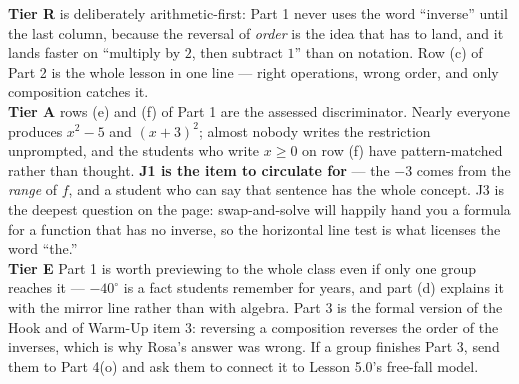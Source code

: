 \documentclass[10pt]{article}
\begin{document}
\begin{teachernote}
\small \textbf{Tier R} is deliberately arithmetic-first: Part 1 never uses the word ``inverse'' until
the last column, because the reversal of \emph{order} is the idea that has to land, and it lands
faster on ``multiply by $2$, then subtract $1$'' than on notation. Row (c) of Part 2 is the whole
lesson in one line --- right operations, wrong order, and only composition catches it.
\\[3pt]
\textbf{Tier A} rows (e) and (f) of Part 1 are the assessed discriminator. Nearly everyone produces
$x^{2}-5$ and $(x+3)^{2}$; almost nobody writes the restriction unprompted, and the students who
write $x\ge0$ on row (f) have pattern-matched rather than thought. \textbf{J1 is the item to
circulate for} --- the $-3$ comes from the \emph{range} of $f$, and a student who can say that
sentence has the whole concept. J3 is the deepest question on the page: swap-and-solve will happily
hand you a formula for a function that has no inverse, so the horizontal line test is what licenses
the word ``the.''
\\[3pt]
\textbf{Tier E} Part 1 is worth previewing to the whole class even if only one group reaches it ---
$-40^\circ$ is a fact students remember for years, and part (d) explains it with the mirror line
rather than with algebra. Part 3 is the formal version of the Hook and of Warm-Up item 3: reversing
a composition reverses the order of the inverses, which is why Rosa's answer was wrong. If a group
finishes Part 3, send them to Part 4(o) and ask them to connect it to Lesson 5.0's free-fall model.
\end{teachernote}
\end{document}
